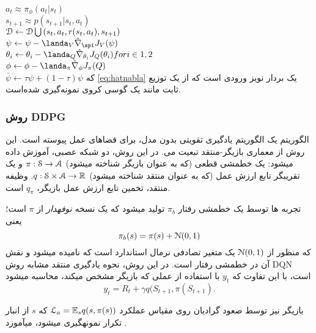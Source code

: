 $a_t \approx \pi_\phi(a_t|s_t)$ \\
$s_{t+1} \approx p(s_{t+1}|s_t,a_t)$\\
$\EuScript{D}\leftarrow \EuScript{D} \bigcup {(s_t,a_t,r(s_t,a_t),s_{t+1})}$ \\
$\psi \leftarrow \psi - \landa_V \hat{\nabla}_\spi J_V (\psi)$ \\
$\theta_i \leftarrow \theta_i - \landa_Q \hat{\nabla}_{\theta_i} J_Q(\theta_i) for i \in {1,2}$\\
$\phi \leftarrow \phi - \landa_\pi \hat{\nabla}_\phi J_\pi (Q)$ \\
$\bar{\psi} \leftarrow \tau \psi + (1-\tau) \psi$
که \ref{eq:hatnabla} یک بردار نویز ورودی است که از یک توزیع ثابت مانند یک گوسی کروی نمونه‌گیری شده‌است.
\subsubsection{روش DDPG}

الگوریتم 
\textit{}
یک الگوریتم یادگیری تقویتی بدون مدل، برای فضاهای عمل پیوسته است. این روش از معماری بازیگر-منتقد تبعیت می. در این روش، دو شبکه عصبی،  آموزش داده می\nf شود: یک خط\nf مشی قطعی (که به عنوان بازیگر شناخته می\nf شود)
$\pi:\EuScript{S} \to \EuScript{A}$
و یک تقریب\nf گر تابع ارزش عمل (که به عنوان منتقد شناخته می\nf شود)
$q: \EuScript{S} \times \EuScript{A} \to \mathbb{R}$.
وظیفه منتقد، تخمین تابع ارزش عمل بازیگر،
$q_\pi$
است.

تجربه ها توسط یک خط\nf مشی رفتار $\pi_b$ تولید می\nf شود که یک نسخه 
\textit{{نوفه\nf دار}}
از $\pi$ است؛ یعنی
$$\pi_b(s) = \pi(s) + \EuScript{N}(0,1)$$
که منظور از
$\EuScript{N}(0,1)$
یک متغیر تصادفی نرمال استاندارد است که 
\textit{}
نامیده می\nf شود و نقش آن  در خط\nf مشی رفتار است.
در این روش، نحوه یادگیری منتقد مشابه روش DQN است، با این تفاوت که $y_t$ با استفاده از عملی که بازیگر مشخص می\nf کند، محاسبه می\nf شود
$$y_t = R_t + \gamma q(S_{t+1},\pi(S_{t+1}).$$

بازیگر نیز توسط صعود گرادیان روی مقیاس عملکرد
$\EuScript{L}_a = \mathbb{E}_s q(s, \pi(s))$
که $s$ از انبار تکرار نمونه\nf گیری می\nf شود، می\nf آموزد
\cite{andrychowicz2017hindsight}.


